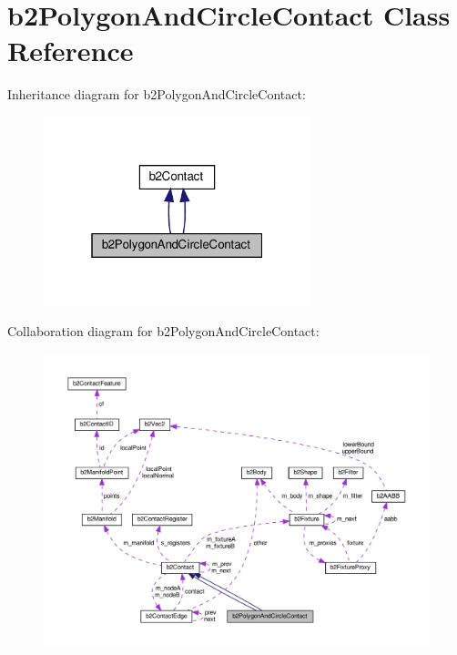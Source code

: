 \hypertarget{classb2PolygonAndCircleContact}{}\section{b2\+Polygon\+And\+Circle\+Contact Class Reference}
\label{classb2PolygonAndCircleContact}


Inheritance diagram for b2\+Polygon\+And\+Circle\+Contact\+:
\nopagebreak
\begin{figure}[H]
\begin{center}
\leavevmode
\includegraphics[width=220pt]{classb2PolygonAndCircleContact__inherit__graph}
\end{center}
\end{figure}


Collaboration diagram for b2\+Polygon\+And\+Circle\+Contact\+:
\nopagebreak
\begin{figure}[H]
\begin{center}
\leavevmode
\includegraphics[width=350pt]{classb2PolygonAndCircleContact__coll__graph}
\end{center}
\end{figure}

